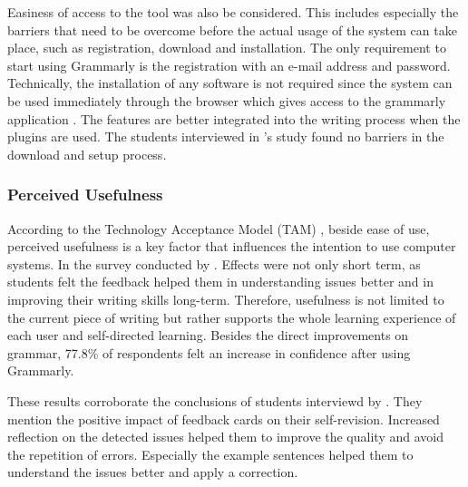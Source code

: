\documentclass[runningheads]{llncs}
\let\OldTextregistered\textregistered
\renewcommand{\textregistered}{\OldTextregistered\xspace}
\begin{document}
Easiness of access to the tool was also be considered. This includes especially the barriers that need to be overcome before the actual usage of the system can take place, such as registration, download and installation. The only requirement to start using Grammarly\textregistered is the registration with an e-mail address and password. Technically, the installation of any software is not required since the system can be used immediately through the browser which gives access to the grammarly application \citep{noauthor_grammarly_nodate}. The features are better integrated into the writing process when the plugins are used. The students interviewed in \citeauthor{nova_utilizing_2018}'s study found no barriers in the download and setup process.

\subsubsection{Perceived Usefulness} 
According to the Technology Acceptance Model (TAM) \citep{davis_user_1989}, beside ease of use, perceived usefulness is a key factor that influences the intention to use computer systems. In the survey conducted by \citeauthor{cavaleri_you_2016} . Effects were not only short term, as students felt the feedback helped them in understanding issues better and in improving their writing skills long-term. Therefore, usefulness is not limited to the current piece of writing but rather supports the whole learning experience of each user and self-directed learning. Besides the direct improvements on grammar, 77.8\% of respondents felt an increase in confidence after using Grammarly\textregistered. 

These results corroborate the conclusions of students interviewd by \textcite{nova_utilizing_2018}. They mention the positive impact of feedback cards on their self-revision. Increased reflection on the detected issues helped them to improve the quality and avoid the repetition of errors. Especially the example sentences helped them to understand the issues better and apply a correction.
\end{document}
